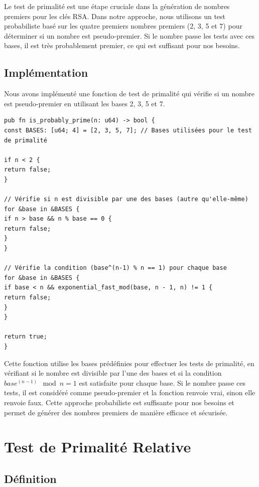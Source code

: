 \documentclass[11pt]{article}
\begin{document}
Le test de primalité est une étape cruciale dans la génération de nombres premiers pour les clés RSA\@.
Dans notre approche, nous utilisons un test probabiliste basé sur les quatre premiers nombres premiers (2, 3, 5 et 7) pour déterminer si un nombre est pseudo-premier.
Si le nombre passe les tests avec ces bases, il est très probablement premier, ce qui est suffisant pour nos besoins.

\subsection{Implémentation}\label{subsec:implementation}

Nous avons implémenté une fonction de test de primalité qui vérifie si un nombre est pseudo-premier en utilisant les bases 2, 3, 5 et 7.


\lstset{language=Rust}
\begin{lstlisting}[caption={Fonction de test de primalité (Rust)}, label={lst:rust\_exponential\_fast\_mod}]
pub fn is_probably_prime(n: u64) -> bool {
const BASES: [u64; 4] = [2, 3, 5, 7]; // Bases utilisées pour le test de primalité

if n < 2 {
return false;
}

// Vérifie si n est divisible par une des bases (autre qu'elle-même)
for &base in &BASES {
if n > base && n % base == 0 {
return false;
}
}

// Vérifie la condition (base^(n-1) % n == 1) pour chaque base
for &base in &BASES {
if base < n && exponential_fast_mod(base, n - 1, n) != 1 {
return false;
}
}

return true;
}
\end{lstlisting}

Cette fonction utilise les bases prédéfinies pour effectuer les tests de primalité, en vérifiant si le nombre est divisible par l'une des bases et si la condition $base^{(n-1)} \mod n = 1$ est satisfaite pour chaque base.
Si le nombre passe ces tests, il est considéré comme pseudo-premier et la fonction renvoie vrai, sinon elle renvoie faux.
Cette approche probabiliste est suffisante pour nos besoins et permet de générer des nombres premiers de manière efficace et sécurisée.


\section{Test de Primalité Relative}\label{sec:test-de-primalite-relative}

\subsection{Définition}\label{subsec:definition}
\end{document}
